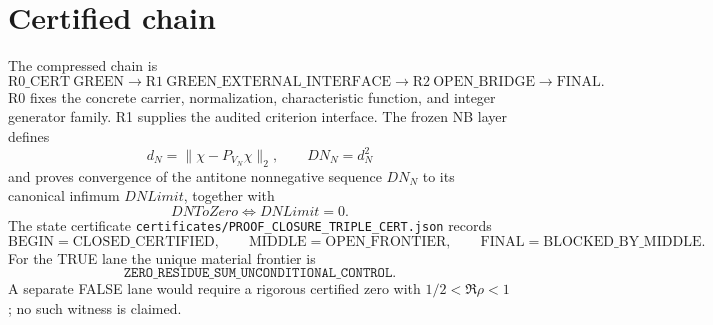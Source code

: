 \section{Certified chain}
The compressed chain is
\[
\mathrm{R0\_CERT\ GREEN}
\longrightarrow
\mathrm{R1\ GREEN\_EXTERNAL\_INTERFACE}
\longrightarrow
\mathrm{R2\ OPEN\_BRIDGE}
\longrightarrow
\mathrm{FINAL}.
\]
R0 fixes the concrete carrier, normalization, characteristic function, and integer
generator family. R1 supplies the audited criterion interface. The frozen NB layer
defines
\[
d_N=\|\chi-P_{V_N}\chi\|_2,\qquad DN_N=d_N^2
\]
and proves convergence of the antitone nonnegative sequence \(DN_N\) to its canonical
infimum \(DNLimit\), together with
\[
DNToZero\iff DNLimit=0.
\]
The state certificate \texttt{certificates/PROOF\_CLOSURE\_TRIPLE\_CERT.json} records
\[
\mathrm{BEGIN=CLOSED\_CERTIFIED},\qquad
\mathrm{MIDDLE=OPEN\_FRONTIER},\qquad
\mathrm{FINAL=BLOCKED\_BY\_MIDDLE}.
\]
For the TRUE lane the unique material frontier is
\[
\boxed{\texttt{ZERO\_RESIDUE\_SUM\_UNCONDITIONAL\_CONTROL}}.
\]
A separate FALSE lane would require a rigorous certified zero with
\(1/2<\Re\rho<1\); no such witness is claimed.
